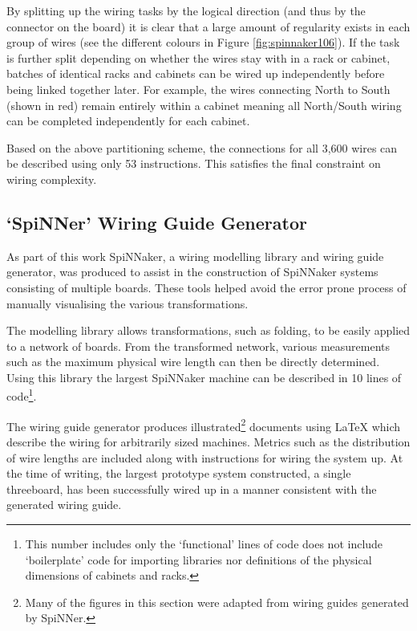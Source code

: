 			By splitting up the wiring tasks by the logical direction (and thus by the
			connector on the board) it is clear that a large amount of regularity
			exists in each group of wires (see the different colours in Figure
			\ref{fig:spinnaker106}). If the task is further split depending on whether
			the wires stay with in a rack or cabinet, batches of identical racks and
			cabinets can be wired up independently before being linked together later.
			For example, the wires connecting North to South (shown in red) remain
			entirely within a cabinet meaning all North/South wiring can be completed
			independently for each cabinet.
			
			Based on the above partitioning scheme, the connections for all 3,600
			wires can be described using only 53 instructions. This satisfies the
			final constraint on wiring complexity.
		
		\subsection{`SpiNNer' Wiring Guide Generator}
			
			As part of this work SpiNNaker, a wiring modelling library and wiring
			guide generator, was produced to assist in the construction of SpiNNaker
			systems consisting of multiple boards. These tools helped avoid the error
			prone process of manually visualising the various transformations.
			
			The modelling library allows transformations, such as folding, to be
			easily applied to a network of boards. From the transformed network,
			various measurements such as the maximum physical wire length can then be
			directly determined. Using this library the largest SpiNNaker machine can
			be described in 10 lines of code\footnote{This number includes only the
			`functional' lines of code does not include `boilerplate' code for
			importing libraries nor definitions of the physical dimensions of cabinets
			and racks.}.
			
			The wiring guide generator produces illustrated\footnote{Many of the
			figures in this section were adapted from wiring guides generated by
			SpiNNer.} documents using \LaTeX{} which describe the wiring for
			arbitrarily sized machines. Metrics such as the distribution of wire
			lengths are included along with instructions for wiring the system up. At
			the time of writing, the largest prototype system constructed, a single
			threeboard, has been successfully wired up in a manner consistent with the
			generated wiring guide.
		
